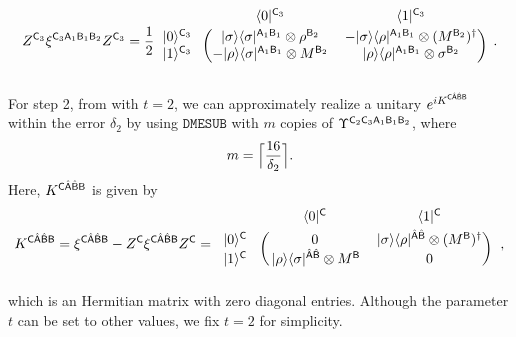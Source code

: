 \begin{align}
    Z^{\sC_3}\xi^{\sC_3\sA_1\sB_1\sB_2}Z^{\sC_3}
    = \f{1}{2}
\begin{blockarray}{ccc}
& \bra{0}^{\sC_3}&  \bra{1}^{\sC_3} \vspace{1mm}\\
\begin{block}{c(cc)}
  \ket{0}^{\sC_3}\hspace*{1mm} & \ketbra{\sigma}{\sigma}^{\sA_1\sB_1}\otimes\rho^{\sB_2} & -\ketbra{\sigma}{\rho}^{\sA_1\sB_1}\otimes (M^{\sB_2})^\dag \\
  \ket{1}^{\sC_3}\hspace*{1mm} & -\ketbra{\rho}{\sigma}^{\sA_1\sB_1}\otimes M^{\sB_2} & \ketbra{\rho}{\rho}^{\sA_1\sB_1}\otimes\sigma^{\sB_2} \\
\end{block}
\end{blockarray}\hspace{2mm}.
\end{align}



For step 2, from  with $t=2$, we can approximately realize a unitary $e^{iK^{{\mathsf{C}}\hat{{\mathsf{A}}}\hat{{\mathsf{B}}}{\mathsf{B}}}}$ within the error $\delta_2$ by using $\mathtt{DMESUB}$ with $m$ copies of $\Upsilon^{{\mathsf{C}}_2{\mathsf{C}}_3{\mathsf{A}}_1{\mathsf{B}}_1{\mathsf{B}}_2}$, where 
\begin{equation}
\label{eq:m}
m = \Big\lceil\frac{16}{\delta_2}\Big\rceil.
\end{equation}
Here, $K^{{\mathsf{C}}\hat{{\mathsf{A}}}\hat{{\mathsf{B}}}{\mathsf{B}}}$ is given by
\begin{align}
\label{eq:def of L}
    K^{\sC\hat{\sA}\hat{\sB}\sB} 
    = \xi^{\sC\hat{\sA}\hat{\sB}\sB} - Z^{\sC}\xi^{\sC\hat{\sA}\hat{\sB}\sB}Z^{\sC}
    = 
\begin{blockarray}{ccc}
& \bra{0}^{\sC}&  \bra{1}^{\sC} \vspace{1mm}\\
\begin{block}{c(cc)}
  \ket{0}^{\sC}\hspace*{1.5mm} & 0 & \ketbra{\sigma}{\rho}^{\hat{\sA}\hat{\sB}}\otimes (M^{\sB})^\dag \\
  \ket{1}^{\sC}\hspace*{1.5mm} & \hspace*{0.5mm} \ketbra{\rho}{\sigma}^{\hat{\sA}\hat{\sB}}\otimes M^{\sB} & 0 \\
\end{block}
\end{blockarray}\hspace{2.5mm},
\end{align}
which is an Hermitian matrix with zero diagonal entries.
Although the parameter $t$ can be set to other values, we fix $t = 2$ for simplicity.



